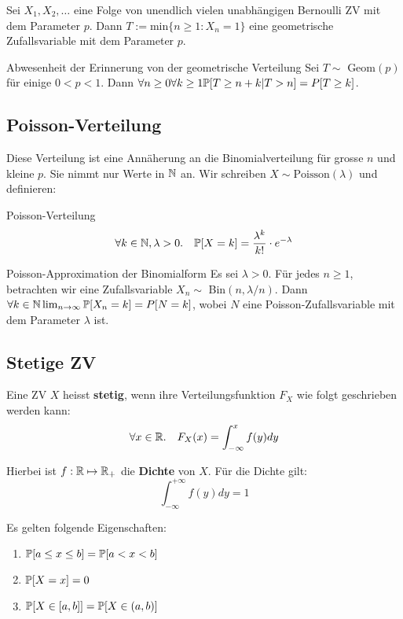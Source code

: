 \begin{subbox}{}
    Sei $X_1, X_2, \ldots$ eine Folge von unendlich vielen unabhängigen Bernoulli ZV mit dem Parameter $p$. Dann
    $T := \text{min}\{n \geq 1 : X_n = 1\}$
    eine geometrische Zufallsvariable mit dem Parameter $p$.
\end{subbox}

\begin{subbox}{Abwesenheit der Erinnerung von der geometrische Verteilung}
    Sei $T \sim$ Geom$(p)$ für einige $0 < p < 1$. Dann
    $\forall n \geq 0 \forall k \geq 1 \mathbb{P}[T \geq n + k | T > n] = P[T \geq k]$.
\end{subbox}

\subsection*{Poisson-Verteilung} Diese Verteilung ist eine Annäherung an die Binomialverteilung für grosse $n$ und kleine $p$. Sie nimmt nur Werte in $\mathbb{N}$ an. Wir schreiben $X \sim \text{Poisson}(\lambda)$ und definieren:

\begin{mainbox}{Poisson-Verteilung}
    $$\forall k \in \mathbb{N}, \lambda > 0. \quad \mathbb{P}[X = k] = \frac{\lambda^k}{k!}\cdot e^{-\lambda}$$
\end{mainbox}

\begin{subbox}{Poisson-Approximation der Binomialform}
    Es sei $\lambda > 0$. Für jedes $n \geq 1$,
    betrachten wir eine Zufallsvariable $X_n \sim$ Bin$(n, \lambda / n)$. Dann
    $\forall k \in \mathbb{N} \lim_{n \rightarrow \infty} \mathbb{P}[X_n = k] = P[N = k]$,
    wobei $N$ eine Poisson-Zufallsvariable mit dem Parameter $\lambda$ ist.
\end{subbox}

\subsection{Stetige ZV}

\begin{mainbox}{}
    Eine ZV $X$ heisst \textbf{stetig}, wenn ihre Verteilungsfunktion $F_X$ wie folgt geschrieben werden kann:
    $$\forall x \in \mathbb{R}. \quad F_X(x) = \int_{-\infty}^x f(y)dy$$
\end{mainbox}

Hierbei ist $f: \mathbb{R} \mapsto \mathbb{R}_+$ die \textbf{Dichte} von $X$. Für die Dichte gilt:
$$\int_{-\infty}^{+\infty} f(y)dy = 1$$

Es gelten folgende Eigenschaften: 
\begin{enumerate}
    \item $\mathbb{P} [a \leq x \leq b] = \mathbb{P} [a < x < b]$ 
    \item $\mathbb{P}[X = x] = 0$
    \item $\mathbb{P}[X \in [a, b ]] = \mathbb{P} [X \in (a,b)]$
\end{enumerate}


